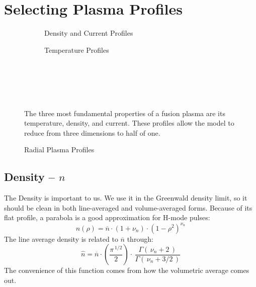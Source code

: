 \chapter{Selecting Plasma Profiles}

\label{chapter:profiles}

\begin{figure*}[h]
    \centering
    \hfill 
    \begin{subfigure}[t]{0.45\textwidth}
        \centering
		\begin{adjustbox}{width=\textwidth}
			\Large
			
		\end{adjustbox}
        \caption{Density and Current Profiles}
    \end{subfigure}
    \hfill
    \begin{subfigure}[t]{0.45\textwidth}
        \centering
		\begin{adjustbox}{width=\textwidth}
			\Large
			
		\end{adjustbox}
        \caption{Temperature Profiles}
    \end{subfigure}
    \hfill \hfill ~\\ ~\\ ~\\
    \caption{Radial Plasma Profiles} ~\\
    \small The three most fundamental properties of a fusion plasma are its temperature, density, and current. These profiles allow the model to reduce from three dimensions to half of one.
\end{figure*}

\section{Density -- $n$}

The Density is important to us. We use it in the Greenwald density limit, so it should be clean in both line-averaged and volume-averaged forms. Because of its flat profile, a parabola is a good approximation for H-mode pulses:
\begin{equation}
	n(\rho) = \overline{n} \cdot \left(1 + \nu_n \right) \cdot \left( 1 - \rho^2  \right)^{\nu_n}
\end{equation}
The line average density is related to $\overline{n}$ through:
\begin{equation}
	\hat{n} =  \overline{n} \cdot \left( \frac{\pi ^ { \, 1/2} }{2} \right)  \cdot \, \frac{ \Gamma( \, \nu_n + 2 \, ) }{ \Gamma( \, \nu_n + 3/2 \, ) }
\end{equation}
The convenience of this function comes from how the volumetric average comes out.

